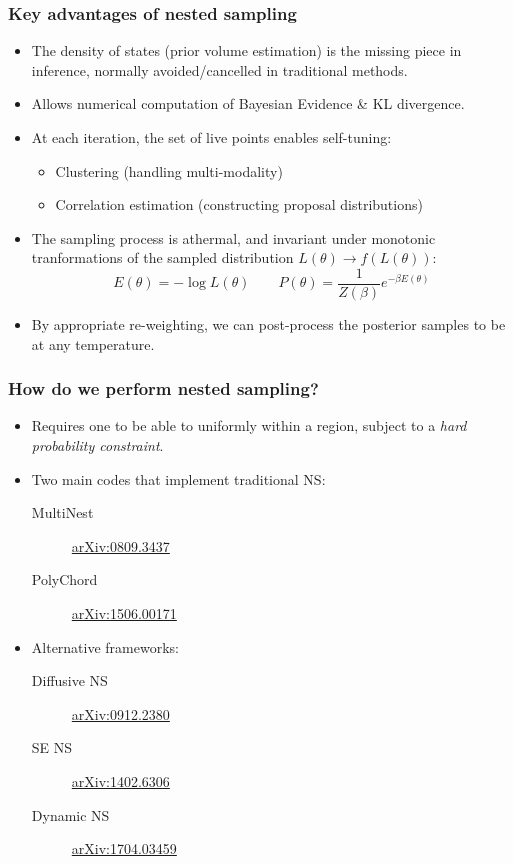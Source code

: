 \documentclass[%
    handout
]{beamer}
\begin{document}
\begin{frame}
    \frametitle{Key advantages of nested sampling} 
    \begin{itemize}
        \item The density of states (prior volume estimation) is the missing piece in inference, normally avoided/cancelled in traditional methods.
        \item Allows numerical computation of Bayesian Evidence \& KL divergence.
        \item At each iteration, the set of live points enables self-tuning:
            \begin{itemize}
                \item Clustering (handling multi-modality)
                \item Correlation estimation (constructing proposal distributions)
            \end{itemize}
        \item The sampling process is athermal, and invariant under monotonic tranformations of the sampled distribution $L(\theta)\to f(L(\theta))$:
            \begin{equation}
                E(\theta) = -\log L(\theta) \qquad P(\theta) = \frac{1}{Z(\beta)}e^{-\beta E(\theta)}
            \end{equation}
        \item By appropriate re-weighting, we can post-process the posterior samples to be at any temperature.
    \end{itemize}
\end{frame}

\begin{frame}
    \frametitle{How do we perform nested sampling?} 
    \begin{itemize}
        \item Requires one to be able to uniformly within a region, subject to a {\em hard probability constraint}.
        \item Two main codes that implement traditional NS\@:
            \begin{description}
                \item[MultiNest] \href{https://arxiv.org/abs/0809.3437}{arXiv:0809.3437} 
                \item[PolyChord] \href{https://arxiv.org/abs/1506.00171}{arXiv:1506.00171} 
            \end{description}
        \item Alternative frameworks:
            \begin{description}
                \item[Diffusive NS] \href{https://arxiv.org/abs/0912.2380}{arXiv:0912.2380} 
                \item[SE NS]\href{https://arxiv.org/abs/1402.6306}{arXiv:1402.6306} 
                \item[Dynamic NS] \href{https://arxiv.org/abs/1704.03459}{arXiv:1704.03459} 
            \end{description}
    \end{itemize}

\end{frame}
\end{document}
